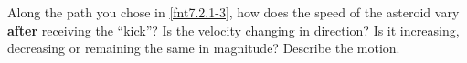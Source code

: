 \label{fnt7.2.1-4}

Along the path you chose in \ref{fnt7.2.1-3}, how does the speed of the asteroid vary \textbf{after} receiving the ``kick''?  Is the velocity changing in direction? Is it increasing, decreasing or remaining the same in magnitude? Describe the motion.